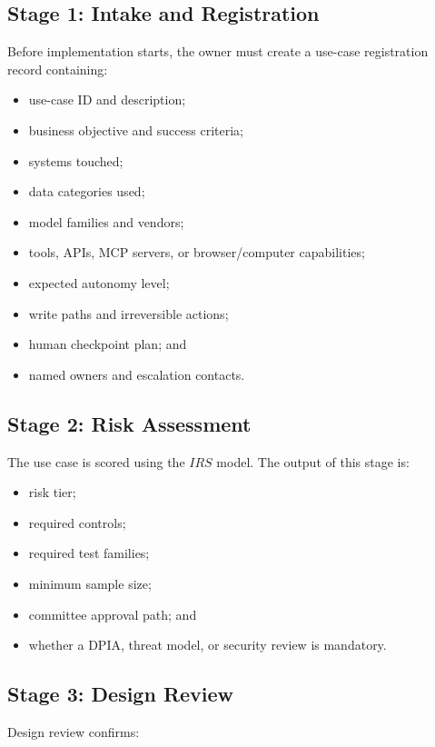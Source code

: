\documentclass[11pt,a4paper]{article}
\begin{document}
\subsection{Stage 1: Intake and Registration}

Before implementation starts, the owner must create a use-case registration record containing:

\begin{itemize}[nosep]
    \item use-case ID and description;
    \item business objective and success criteria;
    \item systems touched;
    \item data categories used;
    \item model families and vendors;
    \item tools, APIs, MCP servers, or browser/computer capabilities;
    \item expected autonomy level;
    \item write paths and irreversible actions;
    \item human checkpoint plan; and
    \item named owners and escalation contacts.
\end{itemize}

\subsection{Stage 2: Risk Assessment}

The use case is scored using the \(IRS\) model. The output of this stage is:

\begin{itemize}[nosep]
    \item risk tier;
    \item required controls;
    \item required test families;
    \item minimum sample size;
    \item committee approval path; and
    \item whether a DPIA, threat model, or security review is mandatory.
\end{itemize}

\subsection{Stage 3: Design Review}

Design review confirms:
\end{document}
